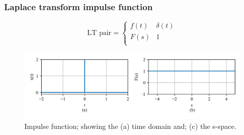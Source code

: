 \documentclass[12pt,letter]{article}
\numberwithin{ex}{section} %
\numberwithin{re}{section} %
\numberwithin{equation}{section}	%
\begin{document}
		\subsubsection{Laplace transform impulse function}

		\begin{equation}
		\text{LT pair} =
			\begin{cases}
			f(t) & \delta(t) \\
			F(s) & 1 \\
			\end{cases}
		\end{equation}

		\begin{figure}[H]
			\centering
			\includegraphics[width=6.5in]{../figures/T_and_S_impulse_function}
			\caption{Impulse function; showing the (a) time domain and; (c) the s-space.}
			\label{fig:T_and_S_impulse_function}
		\end{figure}
\end{document}
